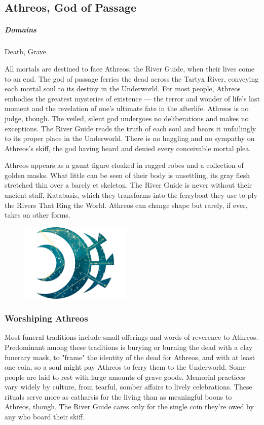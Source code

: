 \subsection*{Athreos, God of Passage} \label{ssec::athreos}
    \subparagraph{Domains} Death, Grave.

    All mortals are destined to face Athreos, the River Guide, when their lives come to an end.
    The god of passage ferries the dead across the Tartyx River, conveying each mortal soul to its destiny in the Underworld.
    For most people, Athreos embodies the greatest mysteries of existence --- the terror and wonder of life's last moment and the revelation of one's ultimate fate in the afterlife.
    Athreos is no judge, though.
    The veiled, silent god undergoes no deliberations and makes no exceptions.
    The River Guide reads the truth of each soul and bears it unfailingly to its proper place in the Underworld.
    There is no haggling and no sympathy on Athreos's skiff, the god having heard and denied every conceivable mortal plea.

    Athreos appears as a gaunt figure cloaked in ragged robes and a collection of golden masks.
    What little can be seen of their body is unsettling, its gray flesh stretched thin over a barely et skeleton.
    The River Guide is never without their ancient staff, Katabasis, which they transforms into the ferryboat they use to ply the Rivers That Ring the World.
    Athreos can change shape but rarely, if ever, takes on other forms.

    \begin{figure}[t]
        \centering
        \includegraphics[width=0.47\textwidth]{02viphoger/img/10s_athreos.png}
    \end{figure}

    \subsubsection{Worshiping Athreos}
        Most funeral traditions include small offerings and words of reverence to Athreos.
        Predominant among these traditions is burying or burning the dead with a clay funerary mask, to "frame" the identity of the dead for Athreos, and with at least one coin, so a soul might pay Athreos to ferry them to the Underworld.
        Some people are laid to rest with large amounts of grave goods.
        Memorial practices vary widely by culture, from tearful, somber affairs to lively celebrations.
        These rituals serve more as catharsis for the living than as meaningful boons to Athreos, though.
        The River Guide cares only for the single coin they're owed by any who board their skiff.

